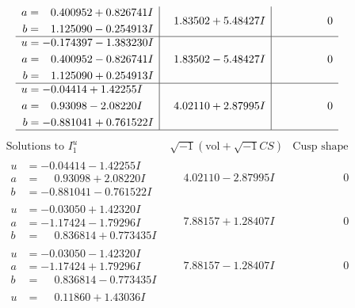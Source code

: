 \documentclass[1p]{elsarticle_modified}
\theoremstyle{definition}
\newcommand{\I}{\sqrt{-1}}
\begin{document}
$$\begin{array}{c|c|c}
\begin{aligned}
a &= \phantom{-}0.400952 + 0.826741 I \\
b &= \phantom{-}1.125090 - 0.254913 I\end{aligned}
 & \phantom{-}1.83502 + 5.48427 I & \phantom{-0.000000 } 0 \\ \hline\begin{aligned}
u &= -0.174397 - 1.383230 I \\
a &= \phantom{-}0.400952 - 0.826741 I \\
b &= \phantom{-}1.125090 + 0.254913 I\end{aligned}
 & \phantom{-}1.83502 - 5.48427 I & \phantom{-0.000000 } 0 \\ \hline\begin{aligned}
u &= -0.04414 + 1.42255 I \\
a &= \phantom{-}0.93098 - 2.08220 I \\
b &= -0.881041 + 0.761522 I\end{aligned}
 & \phantom{-}4.02110 + 2.87995 I & \phantom{-0.000000 } 0\\
 \hline 
 \end{array}$$\newpage$$\begin{array}{c|c|c}  
\text{Solutions to }I^u_{1}& \I (\text{vol} + \sqrt{-1}CS) & \text{Cusp shape}\\
 \hline 
\begin{aligned}
u &= -0.04414 - 1.42255 I \\
a &= \phantom{-}0.93098 + 2.08220 I \\
b &= -0.881041 - 0.761522 I\end{aligned}
 & \phantom{-}4.02110 - 2.87995 I & \phantom{-0.000000 } 0 \\ \hline\begin{aligned}
u &= -0.03050 + 1.42320 I \\
a &= -1.17424 - 1.79296 I \\
b &= \phantom{-}0.836814 + 0.773435 I\end{aligned}
 & \phantom{-}7.88157 + 1.28407 I & \phantom{-0.000000 } 0 \\ \hline\begin{aligned}
u &= -0.03050 - 1.42320 I \\
a &= -1.17424 + 1.79296 I \\
b &= \phantom{-}0.836814 - 0.773435 I\end{aligned}
 & \phantom{-}7.88157 - 1.28407 I & \phantom{-0.000000 } 0 \\ \hline\begin{aligned}
u &= \phantom{-}0.11860 + 1.43036 I \\

\end{aligned}
\end{array}$$
\end{document}
